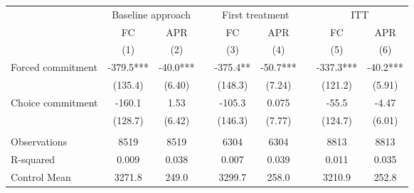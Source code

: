 \begin{tabular}{lcccccccc}
\toprule
      & \multicolumn{2}{c}{Baseline approach} &       & \multicolumn{2}{c}{First treatment} &       & \multicolumn{2}{c}{ITT} \\
\cmidrule{2-3}\cmidrule{5-6}\cmidrule{8-9}      & FC    & APR   &       & FC    & APR   &       & FC    & APR \\
\midrule
      & (1)   & (2)   &       & (3)   & (4)   &       & (5)   & (6) \\
\midrule
\midrule
Forced commitment & -379.5*** & -40.0*** &       & -375.4** & -50.7*** &       & -337.3*** & -40.2*** \\
      & (135.4) & (6.40) &       & (148.3) & (7.24) &       & (121.2) & (5.91) \\
Choice commitment & -160.1 & 1.53  &       & -105.3 & 0.075 &       & -55.5 & -4.47 \\
      & (128.7) & (6.42) &       & (146.3) & (7.77) &       & (124.7) & (6.01) \\
      &       &       &       &       &       &       &       &  \\
\midrule
Observations & 8519  & 8519  &       & 6304  & 6304  &       & 8813  & 8813 \\
R-squared & 0.009 & 0.038 &       & 0.007 & 0.039 &       & 0.011 & 0.035 \\
Control Mean & 3271.8 & 249.0 &       & 3299.7 & 258.0 &       & 3210.9 & 252.8 \\
\bottomrule
\bottomrule
\end{tabular}%
